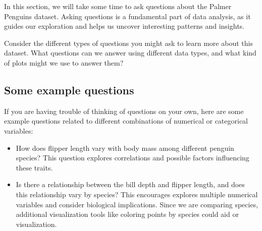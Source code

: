 \documentclass[
  letterpaper,
  DIV=11,
  numbers=noendperiod]{scrreprt}
\begin{document}
In this section, we will take some time to ask questions about the
Palmer Penguins dataset. Asking questions is a fundamental part of data
analysis, as it guides our exploration and helps us uncover interesting
patterns and insights.

Consider the different types of questions you might ask to learn more
about this dataset. What questions can we answer using different data
types, and what kind of plots might we use to answer them?

\hypertarget{some-example-questions}{%
\subsection{Some example questions}\label{some-example-questions}}

If you are having trouble of thinking of questions on your own, here are
some example questions related to different combinations of numerical or
categorical variables:

\begin{tcolorbox}[enhanced jigsaw, left=2mm, colframe=quarto-callout-note-color-frame, leftrule=.75mm, opacitybacktitle=0.6, toptitle=1mm, title=\textcolor{quarto-callout-note-color}{\faInfo}\hspace{0.5em}{Note}, opacityback=0, coltitle=black, colbacktitle=quarto-callout-note-color!10!white, breakable, colback=white, titlerule=0mm, bottomrule=.15mm, arc=.35mm, bottomtitle=1mm, rightrule=.15mm, toprule=.15mm]

\begin{itemize}
\item
  How does flipper length vary with body mass among different penguin
  species? This question explores correlations and possible factors
  influencing these traits.
\item
  Is there a relationship between the bill depth and flipper length, and
  does this relationship vary by species? This encourages explores
  multiple numerical variables and consider biological implications.
  Since we are comparing species, additional visualization tools like
  coloring points by species could aid or visualization.
\end{itemize}

\end{tcolorbox}
\end{document}
